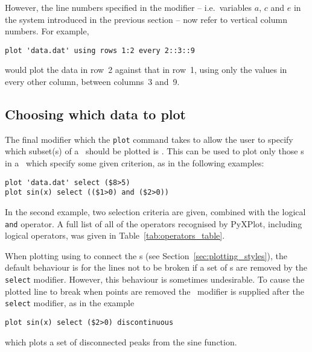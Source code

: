 However, the line numbers specified in the  modifier -- i.e.\
variables $a$, $c$ and $e$ in the system introduced in the previous section --
now refer to vertical column numbers. For example,

\begin{verbatim}
plot 'data.dat' using rows 1:2 every 2::3::9
\end{verbatim}

\noindent would plot the data in row~2 against that in row~1, using only the
values in every other column, between columns~3 and~9.

\subsection{Choosing which data to plot}
\label{sec:select_modifier}

The final modifier which the {\tt plot} command takes to allow the user to
specify which subset(s) of a \datafile\ should be plotted is .
This can be used to plot only those \datapoint s in a \datafile\ which specify
some given criterion, as in the following examples:

\begin{verbatim}
plot 'data.dat' select ($8>5)
plot sin(x) select (($1>0) and ($2>0))
\end{verbatim}

\noindent In the second example, two selection criteria are given, combined
with the logical {\tt and} operator. A full list of all of the operators
recognised by PyXPlot, including logical operators, was given in
Table~\ref{tab:operators_table}.

When plotting using  to connect the \datapoint s (see
Section~\ref{sec:plotting_styles}), the default behaviour is for the lines not
to be broken if a set of \datapoint s are removed by the {\tt select} modifier.
However, this behaviour is sometimes undesirable.  To cause the plotted line to
break when points are removed the \indmodt{discontinuous}\ modifier is supplied
after the {\tt select} modifier, as in the example

\begin{verbatim}
plot sin(x) select ($2>0) discontinuous
\end{verbatim}

\noindent which plots a set of disconnected peaks from the sine function.


